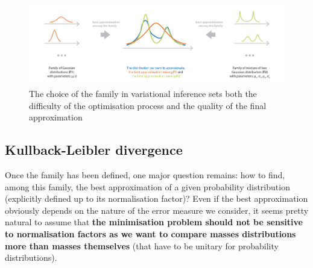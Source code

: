 \begin{figure}[h]
    \centering
\includegraphics[width=\textwidth]{pic/p05c07-snip07.png}
    \caption[The choice of the family in variational inference sets]{The choice of the family in variational inference sets both the difficulty of the optimisation process and the quality of the final approximation}
    \label{fig:p05c07-snip07}
\end{figure}

\subsection{Kullback-Leibler divergence}

Once the family has been defined, one major question remains: how to find, among this family, the best approximation of a given probability distribution (explicitly defined up to its normalisation factor)? Even if the best approximation obviously depends on the nature of the error measure we consider, it seems pretty natural to assume that \textbf{the minimisation problem should not be sensitive to normalisation factors as we want to compare masses distributions more than masses themselves} (that have to be unitary for probability distributions).

